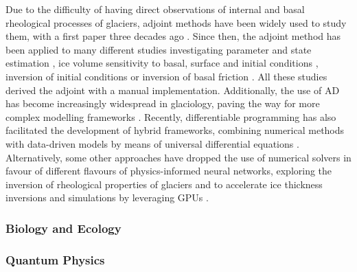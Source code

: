 Due to the difficulty of having direct observations of internal and basal rheological processes of glaciers, adjoint methods have been widely used to study them, with a first paper three decades ago \cite{macayeal1992basal}. 
Since then, the adjoint method has been applied to many different studies investigating parameter and state estimation \cite{goldberg2013parameter}, ice volume sensitivity to basal, surface and initial conditions \cite{heimbach2009greenland}, inversion of initial conditions \cite{mosbeux2016comparison} or inversion of basal friction \cite{morlighem2013inversion}.
All these studies derived the adjoint with a manual implementation. 
Additionally, the use of AD has become increasingly widespread in glaciology, paving the way for more complex modelling frameworks \cite{hascoet2018source, logan2020sicopolis}. 
Recently, differentiable programming has also facilitated the development of hybrid frameworks, combining numerical methods with data-driven models by means of universal differential equations \cite{BolibarSapienza_UDEs}. 
Alternatively, some other approaches have dropped the use of numerical solvers in favour of different flavours of physics-informed neural networks, exploring the inversion of rheological properties of glaciers \cite{wang2022discovering} and to accelerate ice thickness inversions and simulations by leveraging GPUs \cite{Jouvet_Cordonnier_Kim_Lüthi_Vieli_Aschwanden_2021, jouvet2023inversion}. 


\subsubsection{Biology and Ecology}


\subsubsection{Quantum Physics}

